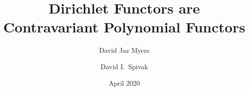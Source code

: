 \documentclass[11pt]{article}
\title{Dirichlet Functors are Contravariant Polynomial Functors}
\author{David Jaz Myers \and David I.\ Spivak}
\date{April 2020}
\begin{document}
\maketitle

\begin{abstract}

\end{abstract}



\printbibliography
\end{document}

